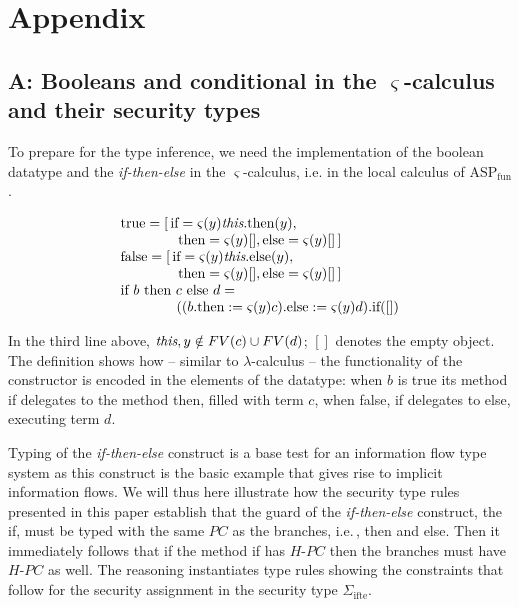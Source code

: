 \documentclass[10pt, conference, compsocconf]{IEEEtran}
\newcommand\aspfunp{ASP${}_\text{fun}$}
\newcommand{\symb}[1]{\makebox{\it #1}}
\newcommand\ie{i.e.\!\,, }
\begin{document}
{


\section*{Appendix}
\subsection*{A: Booleans and conditional in the $\varsigma$-calculus and their security types}
To prepare for the type inference, we need the implementation
of the boolean datatype and the {\it if-then-else} in the $\varsigma$-calculus, i.e. in the local calculus of \aspfunp. 

\[
\begin{array}{l}
\text{true} = \left[\,\text{if} = \varsigma(y) \symb{this}.\text{then}(y), \right. \\
    \qquad\qquad \left. \text{then} = \varsigma(y) [], \text{else} = \varsigma(y) []\,\right]\\
\text{false} = \left[\,\text{if} = \varsigma(y) \symb{this}.\text{else}(y), \right.\\
    \qquad\qquad \left. \text{then} = \varsigma(y) [], \text{else} = \varsigma(y) []\,\right]\\
\text{if}\ b\ \text{then}\ c\ \text{else}\ d = \\
     \qquad\qquad((b.\text{then} := \varsigma(y) c).\text{else} := \varsigma(y) d).\text{if}([])
\end{array}
\]

In the third line above, $\symb{this},y \notin FV(c) \cup FV(d)$; $[]$ denotes the empty
object. The definition shows how -- similar to $\lambda$-calculus -- the functionality of
the constructor is encoded in the elements of the datatype: when $b$ is true 
its method if delegates to the method then, filled with
term $c$, when false, if delegates to else, executing term $d$.

Typing of the {\it if-then-else} construct is a base test for an information flow
type system as this construct is the basic example that gives rise to implicit
information flows. We will thus here illustrate how the security type rules presented
in this paper establish that the guard of the {\it if-then-else} construct, the if, must
be typed with the same $PC$ as the branches, \ie then and else. Then it immediately follows
that if the method if has $H$-$PC$ then the branches must have $H$-$PC$ as well.
The reasoning instantiates type rules showing the constraints that follow for the
security assignment in the security type $\Sigma_{\text{ifte}}$.

}
\end{document}
